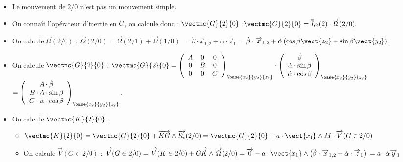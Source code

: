  
\ifprof
\begin{corrige}
\begin{itemize}
\item Le mouvement de $2/0$ n'est pas un mouvement simple. 
\item On connaît l'opérateur d'inertie en $G$, on calcule donc : $\vectmc{G}{2}{0}$ :$
\vectmc{G}{2}{0}=\overline{\overline{I}}_G(2)\cdot \overrightarrow{\Omega}(2/0).$

\item On calcule $\overrightarrow{\Omega}(2/0)$ :
$\overrightarrow{\Omega}(2/0)=\overrightarrow{\Omega}(2/1)+\overrightarrow{\Omega}(1/0)$ 
$=\dot{\beta}\cdot \overrightarrow{x}_{1,2}+\dot{\alpha}\cdot \overrightarrow{z}_{1}$
$=\dot{\beta}\cdot \overrightarrow{x}_{1,2}
+\dot{\alpha}\left(\cos\beta\vect{z_2}+\sin\beta\vect{y_{2}}\right)$.

\item On calcule $\vectmc{G}{2}{0}$ : 
$
\vectmc{G}{2}{0}=\left(
\begin{array}{ccc}
A & 0 & 0 \\ 
0 & B & 0 \\ 
0 & 0 & C
\end{array}
\right)_{\base{{x}_2}{{y}_2}{{z}_2}} \cdot 
\left(
\begin{array}{c}
\dot{\beta}\\
\dot{\alpha}\cdot \sin\beta\\
\dot{\alpha}\cdot \cos\beta\\
\end{array}
\right)_{\base{{x}_2}{{y}_2}{{z}_2}}$
$=\left(
\begin{array}{c}
A\cdot \dot{\beta}\\
B\cdot \dot{\alpha}\cdot \sin\beta\\
C\cdot \dot{\alpha}\cdot \cos\beta\\
\end{array}
\right)_{\base{{x}_2}{{y}_2}{{z}_2}}.$

\item On calcule $\vectmc{K}{2}{0}$ : 
\begin{itemize}
\item $\vectmc{K}{2}{0}=\vectmc{G}{2}{0}+\overrightarrow{KG}\wedge \overrightarrow{R_c}(2/0)
=\vectmc{G}{2}{0}+a\cdot \vect{x_{1}}\wedge M\cdot \overrightarrow{V}(G\in 2/0)$
\item On calcule $\overrightarrow{V}(G\in 2/0)$ : 
$\overrightarrow{V}(G\in 2/0)=\overrightarrow{V}(K\in 2/0)+\overrightarrow{GK}\wedge \overrightarrow{\Omega}(2/0)=
\overrightarrow{0}-a\cdot \vect{x_{1}}\wedge \left(\dot{\beta}\cdot \overrightarrow{x}_{1,2}+\dot{\alpha}\cdot \overrightarrow{z}_{1}\right)\\
=a\cdot \dot{\alpha}\overrightarrow{y}_{1} $


\end{itemize}
\end{itemize}
\end{corrige}
